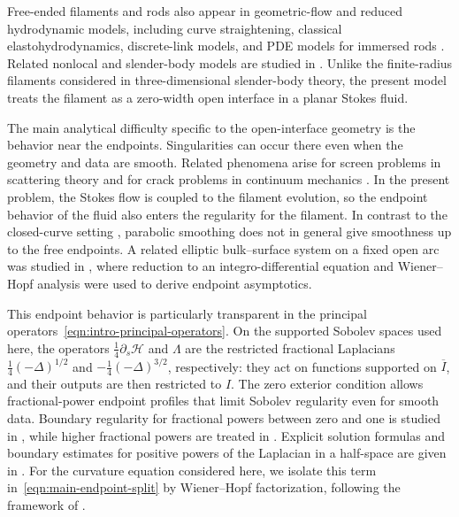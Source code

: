 \documentclass[11pt,reqno]{amsart}
\theoremstyle{plain}
\theoremstyle{definition}
\numberwithin{equation}{section}
\newcommand{\paren}[1]{\left(#1\right)}
\newcommand{\p}{\partial}
\newcommand{\mc}[1]{\mathcal{#1}}
\begin{document}
Free-ended filaments and rods also appear in geometric-flow and reduced hydrodynamic models, including curve straightening, classical elastohydrodynamics, discrete-link models, and PDE models for immersed rods
\cite{Oelz2011CurveStraightening,MoriOhm2023Elastohydrodynamics,
AlougesLefebvreLepotLevillainMoreau2025NLink,
AlbrittonOhm2025RodsInFlows}.
Related nonlocal and slender-body models are studied in
\cite{TornbergShelley2004,MoriOhmSpirn2020SBT,
MoriOhmSpirn2020SBTFreeEnds,Ohm2026NonlocalCurve,
Ohm2026FreeBoundary3D,Ohm2025SlenderBodyFreeBoundary}.
Unlike the finite-radius filaments considered in three-dimensional slender-body theory, the present model treats the filament as a zero-width open interface in a planar Stokes fluid.

The main analytical difficulty specific to the open-interface geometry is the behavior near the endpoints. Singularities can occur there even when the geometry and data are smooth. Related phenomena arise for screen problems in scattering theory
\cite{Hayashi1973OpenBoundary,Stephan1987ScreenProblems}
and for crack problems in continuum mechanics
\cite{DuduchavaWendland1995CrackProblems,CostabelDaugeDuduchava2003CrackAsymptotics}.
In the present problem, the Stokes flow is coupled to the filament evolution, so the endpoint behavior of the fluid also enters the regularity for the filament. In contrast to the closed-curve setting
\cite{GarciaJuarezKuoMori2025Inextensible},
parabolic smoothing does not in general give smoothness up to the free endpoints. A related elliptic bulk--surface system on a fixed open arc was studied in
\cite{EpsteinMoriZhou2026BulkSurface},
where reduction to an integro-differential equation and Wiener--Hopf analysis were used to derive endpoint asymptotics.

This endpoint behavior is particularly transparent in the principal operators~\eqref{eqn:intro-principal-operators}. On the supported Sobolev spaces used here, the operators $\frac{1}{4}\p_s\mc H$ and $\Lambda$ are the restricted fractional Laplacians
$\frac{1}{4}\paren{-\Delta}^{1/2}$ and
$-\frac{1}{4}\paren{-\Delta}^{3/2}$, respectively: they act on functions supported on $\overline{I}$, and their outputs are then restricted to $I$. The zero exterior condition allows fractional-power endpoint profiles that limit Sobolev regularity even for smooth data. Boundary regularity for fractional powers between zero and one is studied in
\cite{RosOtonSerra2014BoundaryRegularity},
while higher fractional powers are treated in
\cite{Grubb2015FractionalLaplacians}.
Explicit solution formulas and boundary estimates for positive powers of the Laplacian in a half-space are given in
\cite{AbatangeloEtAl2019HalfSpace}.
For the curvature equation considered here, we isolate this term in~\eqref{eqn:main-endpoint-split} by Wiener--Hopf factorization, following the framework of
\cite{eskin1981boundary}.
\end{document}
